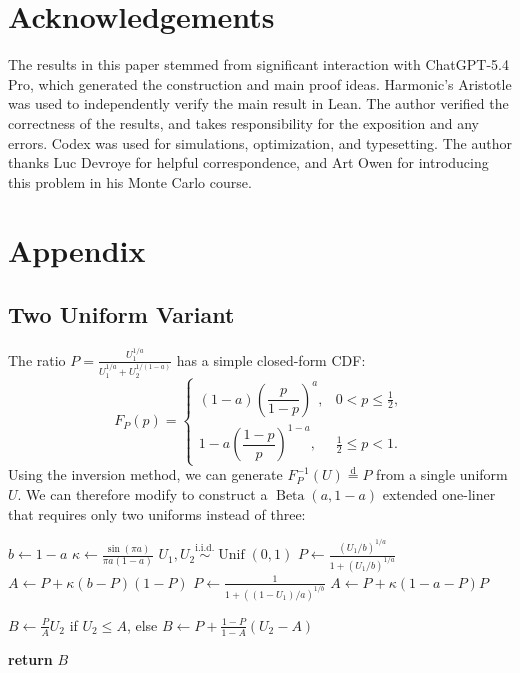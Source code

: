 \documentclass[11pt]{article}
\theoremstyle{plain}
\theoremstyle{remark}
\newcommand{\eqdist}{\mathrel{\overset{\mathrm{d}}{=}}}
\begin{document}
\section*{Acknowledgements}
The results in this paper stemmed from significant interaction with ChatGPT-5.4 Pro, which generated the construction and main proof ideas.
Harmonic's Aristotle \cite{achim2025aristotleimolevelautomatedtheorem} was used to independently verify the main result in Lean.
The author verified the correctness of the results, and takes responsibility for the exposition and any errors.
Codex was used for simulations, optimization, and typesetting.
The author thanks Luc Devroye for helpful correspondence, and Art Owen for introducing this problem in his Monte Carlo course.

\nocite{johnk1964beta,devroye1986nonuniform}



\appendix
\section{Appendix}
\label{sec:appendix-details}
\subsection{Two Uniform Variant}
\label{sec:two-uniform-variant}

The ratio $P=\frac{U_1^{1/a}}{U_1^{1/a} + U_2^{1/(1-a)}}$ has a simple closed-form CDF:
\[
  F_P(p)=
  \begin{cases}
    (1-a)\left(\dfrac{p}{1-p}\right)^a, & 0<p\le \tfrac12, \\[1ex]
    1-a\left(\dfrac{1-p}{p}\right)^{1-a}, & \tfrac12 \le p<1.
  \end{cases}
\]
Using the inversion method, we can generate $F_P^{-1}(U) \eqdist P$ from a single uniform $U$. 
We can therefore modify  to construct a $\operatorname{Beta}(a,1-a)$ extended one-liner that requires only two uniforms instead of three:
\begin{algorithm}[H]
  \caption{$\operatorname{Beta}(a,1-a)$ generator, $0<a<1$}
  \label{alg:beta-compact}
  \begin{algorithmic}[1]
    \State $b \gets 1-a$
    \State $\kappa \gets \frac{\sin(\pi a)}{\pi a(1-a)}$
    \State $U_1,U_2 \overset{\mathrm{i.i.d.}}{\sim} \operatorname{Unif}(0,1)$
      \State $P \gets \frac{(U_1/b)^{1/a}}{1+(U_1/b)^{1/a}}$
      \State $A \gets P+\kappa(b-P)(1-P)$
    \Else
      \State $P \gets \frac{1}{1+\left((1-U_1)/a\right)^{1/b}}$
      \State $A \gets P+\kappa(1-a-P)P$
    \EndIf
    \State \parbox[t]{0.82\linewidth}{$B \gets \frac{P}{A}U_2$ if $U_2 \le A$, else $B \gets P+\frac{1-P}{1-A}(U_2-A)$}
    \State \textbf{return} $B$
  \end{algorithmic}
\end{algorithm}
\end{document}
